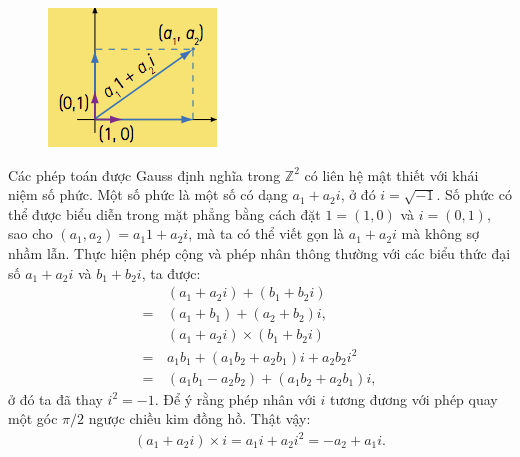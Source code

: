 \begin{multicols}{2}
\begin{tBox}
\begin{figure}
			\vspace*{-15pt}
			\centering
			\captionsetup{labelformat= empty, justification=centering}
			\hspace*{-12pt}\includegraphics[width= 1.15\linewidth]{mosaique-6.png}
			\vspace*{-15pt}
		\end{figure}
		Các phép toán được Gauss định nghĩa trong $\mathbb Z^2$ có liên hệ mật thiết với khái niệm số phức. Một số phức là một số có dạng $a_1 + a_2 i$, ở đó $i = \sqrt{-1}$. Số phức có thể được biểu diễn trong mặt phẳng bằng cách đặt $1 = (1, 0)$ và $i = (0, 1)$, sao cho $(a_1, a_2) = a_1 1 + a_2 i$, mà ta có thể viết gọn là $a_1 + a_2 i$ mà không sợ nhầm lẫn. Thực hiện phép cộng và phép nhân thông thường với các biểu thức đại số $a_1 + a_2 i$ và $b_1 + b_2 i$, ta được:
		\begin{align*}
			&(a_1 + a_2 i) + (b_1 + b_2i) \\
			= \,&(a_1 + b_1) + (a_2 + b_2) i, \\
			&(a_1 + a_2i) \times (b_1 + b_2i) \\
			= \,&a_1 b_1 + (a_1 b_2 + a_2 b_1) i + a_2 b_2 i^2 \\
			= \,&( a_1  b_1 - a_2  b_2) + (a_1 b_2 + a_2 b_1) i ,
		\end{align*}
		ở đó ta đã thay $i^2 = -1$.
		\vskip 0.1cm
		Để ý rằng phép nhân với $i$ tương đương với phép quay một góc $\pi / 2$ ngược chiều kim đồng hồ. Thật vậy:
		\begin{align*}
			(a_1 + a_2 i) \times i = a_1 i + a_2 i^2 = -a_2 + a_1 i.

\end{align*}
\end{tBox}
\end{multicols}
